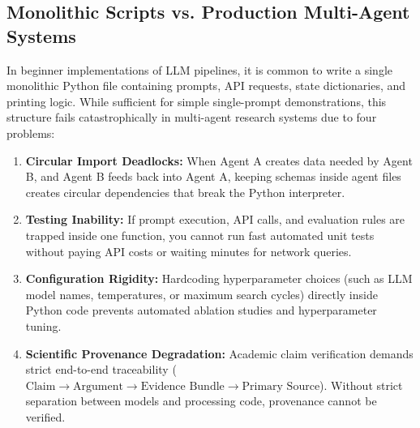 \documentclass[11pt,a4paper]{article}
\begin{document}
\subsection{Monolithic Scripts vs. Production Multi-Agent Systems}
In beginner implementations of LLM pipelines, it is common to write a single monolithic Python file containing prompts, API requests, state dictionaries, and printing logic. While sufficient for simple single-prompt demonstrations, this structure fails catastrophically in multi-agent research systems due to four problems:
\begin{enumerate}[leftmargin=*]
    \item \textbf{Circular Import Deadlocks:} When Agent A creates data needed by Agent B, and Agent B feeds back into Agent A, keeping schemas inside agent files creates circular dependencies that break the Python interpreter.
    \item \textbf{Testing Inability:} If prompt execution, API calls, and evaluation rules are trapped inside one function, you cannot run fast automated unit tests without paying API costs or waiting minutes for network queries.
    \item \textbf{Configuration Rigidity:} Hardcoding hyperparameter choices (such as LLM model names, temperatures, or maximum search cycles) directly inside Python code prevents automated ablation studies and hyperparameter tuning.
    \item \textbf{Scientific Provenance Degradation:} Academic claim verification demands strict end-to-end traceability ($\text{Claim} \rightarrow \text{Argument} \rightarrow \text{Evidence Bundle} \rightarrow \text{Primary Source}$). Without strict separation between models and processing code, provenance cannot be verified.
\end{enumerate}
\end{document}
